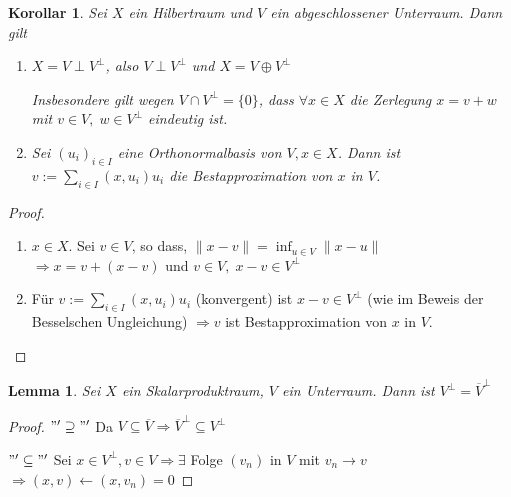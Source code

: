 \documentclass[ngerman]{report}
\theoremstyle{plain}%
\newtheorem{lemma}[thm]{Lemma}
\newtheorem{cor}[thm]{Korollar}
\theoremstyle{definition}%
\theoremstyle{myStyle}
\newcommand{\norm}[1]{\|#1\|}
\newcommand{\df}[1][]{%
	\overset{#1}{\Rightarrow}
}
\newcommand{\ff}[3]{(#1_#2)_{#2\in#3}}
\begin{document}
	\begin{cor}
		Sei $X$ ein Hilbertraum und $V$ ein abgeschlossener Unterraum. Dann gilt 
			\begin{enumerate}
				\item $X = V \perp V^\perp$, also $ V\perp V^\perp$ und $X = V \oplus V^\perp$\par
				Insbesondere gilt wegen $V\cap V^\perp = \{0\}$, dass $\forall x\in X$ die Zerlegung $x = v + w$ mit $v\in V,\;w\in V^\perp$ eindeutig ist.
				\item Sei $\ff{u}{i}{I}$ eine Orthonormalbasis von $V, x\in X$. Dann ist 
				$v := \sum_{i\in I} (x,u_i) u_i$ die Bestapproximation von $x$ in $V$.
			\end{enumerate}
	\end{cor}
	\begin{proof}
		\begin{enumerate}
			\item $x\in X$. Sei $v\in V$, so dass, $\norm{x-v} = \inf_{u\in V}\norm{x-u}$
			$\df x = v + (x-v)$ und $v\in V,\;x-v \in V^\perp$
			\item Für $v := \sum_{i\in I} (x, u_i) u_i$ (konvergent) ist $x -v \in V^\perp$
			(wie im Beweis der Besselschen Ungleichung)
			$\df v$ ist Bestapproximation von $x$ in $V$.
		\end{enumerate}
	\end{proof}

	\begin{lemma}
		Sei $X$ ein Skalarproduktraum, $V$ ein Unterraum. Dann ist $V^\perp = \overline{V}^\perp$
	\end{lemma}
	\begin{proof}
		$"'\supseteq"'$  Da $V\subseteq \overline{V} \df \overline{V}^\perp \subseteq V^\perp$ \par
		$"'\subseteq"'$ Sei $x\in V^\perp, v\in V \df \exists$ Folge $(v_n)$ in $V$ mit $v_n \to v$
		$\df (x,v) \leftarrow (x,v_n) = 0$
	\end{proof}
\end{document}

